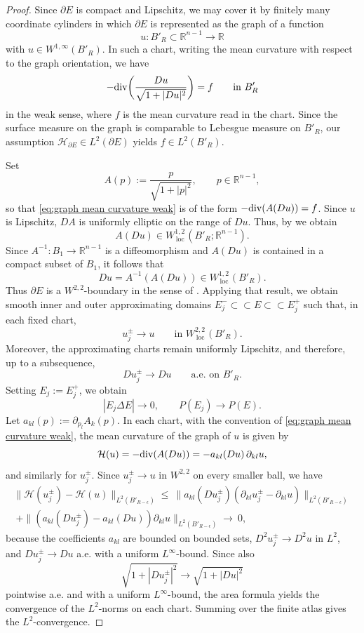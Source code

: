 \documentclass[reqno,11pt]{amsart}
\def\loc{{\mathop\mathrm{\,loc\,}}}
\newcommand{\R}{\mathbb R}
\numberwithin{equation}{section}
\theoremstyle{remark}
\begin{document}
\begin{proof}
Since $\partial E$ is compact and Lipschitz, we may cover it by finitely many coordinate cylinders in which $\partial E$ is represented as the graph of a function
$$
u\colon B'_R\subset \mathbb R^{n-1}\to \mathbb R
$$
with $u\in W^{1,\infty}(B'_R)$. In such a chart, writing the mean curvature with respect to the graph orientation, we have
\begin{equation}\label{eq:graph mean curvature weak}
-{\rm div}\bigg(\frac{Du}{\sqrt{1+|Du|^2}}\bigg)=f
\qquad \text{in } B'_R
\end{equation}
in the weak sense, where $f$ is the mean curvature read in the chart. Since the surface measure on the graph is comparable to Lebesgue measure on $B'_R$, our assumption $\mathcal H_{\partial E}\in L^2(\partial E)$ yields $f\in L^2(B'_R)$.

Set
$$
A(p):=\frac{p}{\sqrt{1+|p|^2}},\qquad p\in \mathbb R^{n-1},
$$
so that \eqref{eq:graph mean curvature weak} is of the form $-{\rm div}(A(Du))=f$. Since $u$ is Lipschitz, $DA$ is uniformly elliptic on the range of $Du$. Thus, by \cite[Theorem~2.1]{CiMa2018} we obtain
$$
A(Du)\in W^{1,2}_\loc(B'_R;\mathbb R^{n-1}).
$$
Since $A^{-1}: B_1\to \R^{n-1}$ is a diffeomorphism and $A(Du)$ is contained in a compact subset of $B_1$, it follows that
$$
Du=A^{-1}(A(Du))\in W^{1,2}_\loc(B'_R).
$$
Thus $\partial E$ is a $W^{2,2}$-boundary in the sense of \cite[Theorem~2(3)]{Antonini2024}. Applying that result, we obtain smooth inner and outer approximating domains $E^-_j\subset\subset E \subset\subset E^+_j$ such that, in each fixed chart,
$$
u^\pm_j\to u \qquad \text{in }W^{2,2}_\loc(B'_{R}).
$$
Moreover, the approximating charts remain uniformly Lipschitz, and therefore, up to a subsequence,
$$
Du^\pm_j\to Du \qquad \text{a.e. on }B'_{R}.
$$
Setting $E_j:=E_j^+$, we obtain
$$
|E_j\Delta E|\to 0,\qquad P(E_j)\to P(E).
$$
Let $a_{kl}(p):=\partial_{p_l}A_k(p)$. In each chart, with the convention of
\eqref{eq:graph mean curvature weak}, the mean curvature of the graph of $u$ is given by
$$
\mathcal H(u)= -{\rm div}(A(Du))=-a_{kl}(Du)\,\partial_{kl}u,
$$
and similarly for $u^\pm_j$. Since $u^\pm_j\to u$ in $W^{2,2}$ on every smaller ball, we have
\begin{multline*}
\|\mathcal H(u^\pm_j)-\mathcal H(u)\|_{L^2(B'_{R-\epsilon})}
\le \ \|a_{kl}(Du^\pm_j)(\partial_{kl}u^\pm_j-\partial_{kl}u)\|_{L^2(B'_{R-\epsilon})}\\
\ + \|(a_{kl}(Du^\pm_j)-a_{kl}(Du))\partial_{kl}u\|_{L^2(B'_{R-\epsilon})}
\to \ 0,
\end{multline*}
because the coefficients $a_{kl}$ are bounded on bounded sets, $D^2u^\pm_j\to D^2u$ in $L^2$, and $Du^\pm_j\to Du$ a.e. with a uniform $L^\infty$-bound. Since also
$$
\sqrt{1+|Du^\pm_j|^2}\to \sqrt{1+|Du|^2}
$$
pointwise a.e. and with a uniform $L^\infty$-bound, the area formula yields the convergence of the $L^2$-norms on each chart. Summing over the finite atlas gives the $L^2$-convergence. 
\end{proof}
\end{document}
